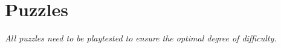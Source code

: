 \chapter{Puzzles}
\textit{All puzzles need to be playtested to ensure the optimal degree of difficulty.}



